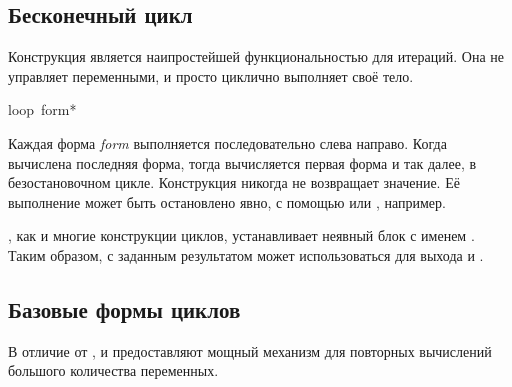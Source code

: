 \subsection{Бесконечный цикл}

Конструкция  является наипростейшей функциональностью для итераций.
Она не управляет переменными, и просто циклично выполняет своё тело.

\begin{defmac}
loop {\,form}*

Каждая форма \emph{form} выполняется последовательно слева направо.
Когда вычислена последняя форма, тогда вычисляется первая форма и так далее,
в безостановочном цикле.
Конструкция  никогда не возвращает значение. Её выполнение может быть
остановлено явно, с помощью  или , например.

, как и многие конструкции циклов, устанавливает неявный блок с именем
{\nil}.
Таким образом,  с заданным результатом может использоваться для
выхода и .
\end{defmac}

\subsection{Базовые формы циклов}

В отличие от ,  и  предоставляют мощный механизм для
повторных вычислений большого количества переменных. 


